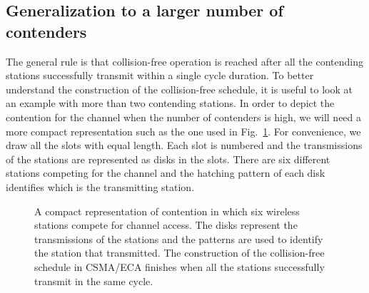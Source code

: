 \documentclass[journal]{IEEEtran}
\begin{document}
\subsection{Generalization to a larger number of contenders}
The general rule is that collision-free operation is reached after all the contending stations successfully transmit within a single cycle duration.
To better understand the construction of the collision-free schedule, it is useful to look at an example with more than two contending stations.
In order to depict the contention for the channel when the number of contenders is high, we will need a more compact representation such as the one used in Fig.~\ref{fig:ca_vs_eca_compact}.
For convenience, we draw all the slots with equal length.
Each slot is numbered and the transmissions of the stations are represented as disks in the slots.
There are six different stations competing for the channel and the hatching pattern of each disk identifies which is the transmitting station.

\begin{figure}[!t]
\centering
{}
\caption{A compact representation of contention in which six wireless stations compete for channel access. The disks represent the transmissions of the stations and the  patterns are used to identify the station that transmitted. The construction of the collision-free schedule in CSMA/ECA finishes when all the stations successfully transmit in the same cycle.}
\label{fig:ca_vs_eca_compact}
\end{figure}
\end{document}
